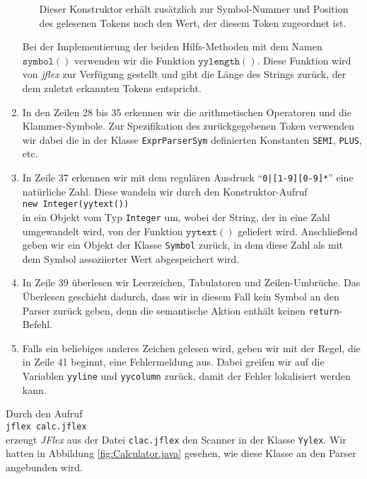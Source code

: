 \begin{enumerate}
\begin{enumerate}
            Dieser Konstruktor erh\"alt zus\"atzlich zur Symbol-Nummer und Position des gelesenen Tokens noch
            den Wert, der diesem Token zugeordnet ist.
      \end{enumerate}
      Bei der Implementierung der beiden Hilfs-Methoden mit dem Namen $\texttt{symbol}()$ verwenden
      wir die Funktion $\texttt{yylength}()$.  Diese Funktion wird von \textsl{jflex} zur Verf\"ugung
      gestellt und gibt die L\"ange des Strings zur\"uck, der dem zuletzt erkannten Tokens entspricht.
\item In den Zeilen 28 bis 35 erkennen wir die arithmetischen Operatoren und die Klammer-Symbole.
      Zur Spezifikation des zur\"uckgegebenen Token verwenden wir dabei die in der Klasse \texttt{ExprParserSym}
      definierten Konstanten \texttt{SEMI}, \texttt{PLUS}, etc. 
\item In Zeile 37 erkennen wir mit dem regul\"aren Ausdruck ``\texttt{0|[1-9][0-9]*}'' eine nat\"urliche
      Zahl.  Diese wandeln wir durch den Konstruktor-Aufruf 
      \\[0.2cm]
      \hspace*{1.3cm}
      \texttt{new Integer(yytext())}
      \\[0.2cm]
      in ein Objekt vom Typ \texttt{Integer} um, wobei der String, der in eine Zahl umgewandelt wird, von der
      Funktion $\texttt{yytext}()$ geliefert wird.  Anschlie{\ss}end geben wir ein Objekt der Klasse \texttt{Symbol} zur\"uck,
      in dem diese Zahl als mit dem Symbol assoziierter Wert abgespeichert wird.
\item In Zeile 39 \"uberlesen wir Leerzeichen, Tabulatoren und Zeilen-Umbr\"uche.
      Das \"Uberlesen geschieht dadurch, dass wir in diesem Fall kein Symbol an den Parser zur\"uck
      geben, denn die semantische Aktion enth\"alt keinen \texttt{return}-Befehl.
\item Falls ein beliebiges anderes Zeichen gelesen wird, geben wir mit der Regel, die in Zeile 41 
      beginnt, eine Fehlermeldung aus.  Dabei greifen wir auf die Variablen 
      \texttt{yyline} und \texttt{yycolumn} zur\"uck, damit der Fehler lokalisiert werden kann.
\end{enumerate}
Durch den Aufruf
\\[0.2cm]
\hspace*{1.3cm}
\texttt{jflex calc.jflex}
\\[0.2cm]
erzeugt \textsl{JFlex} aus der Datei \texttt{clac.jflex} den Scanner in der Klasse \texttt{Yylex}.
Wir hatten in Abbildung 
\ref{fig:Calculator.java} gesehen, wie diese Klasse an den Parser angebunden wird.



